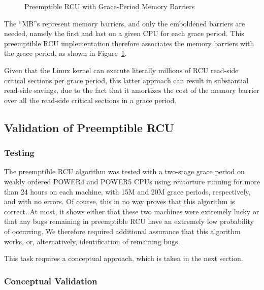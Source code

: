 \begin{figure}[htb]
\centering
{}
\caption{Preemptible RCU with Grace-Period Memory Barriers}
\label{app:rcuimpl:Preemptible RCU with Grace-Period Memory Barriers}
\end{figure}

The ``MB''s represent memory barriers, and only the emboldened
barriers are needed, namely the first and last on a given CPU
for each grace period.
This preemptible RCU implementation therefore associates the memory
barriers with the grace period, as shown in
Figure~\ref{app:rcuimpl:Preemptible RCU with Grace-Period Memory Barriers}.

Given that the Linux kernel can execute literally millions of RCU
read-side critical sections per grace period, this latter approach
can result in substantial read-side savings, due to the fact that it
amortizes the cost of the memory barrier over all the read-side critical
sections in a grace period.

\subsection{Validation of Preemptible RCU}
\label{app:rcuimpl:Validation of Preemptible RCU}

\subsubsection{Testing}
\label{app:rcuimpl:Testing}

The preemptible RCU algorithm was tested with a two-stage grace period
on weakly ordered POWER4 and POWER5 CPUs using rcutorture running for
more than 24 hours on each machine, with 15M and 20M grace periods,
respectively, and with no errors.
Of course, this in no way proves that this algorithm is correct.
At most, it shows either that these two machines were extremely
lucky or that any bugs remaining in preemptible RCU have an extremely
low probability of occurring.
We therefore required additional assurance that this algorithm works,
or, alternatively, identification of remaining bugs.

This task requires a conceptual approach,
which is taken in the next section.

\subsubsection{Conceptual Validation}
\label{app:rcuimpl:Conceptual Validation}

